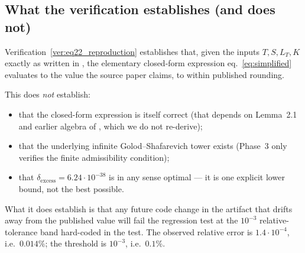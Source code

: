 \subsection{What the verification establishes (and does not)}

Verification~\ref{ver:eq22_reproduction} establishes that, given the
inputs $T, S, L_T, K$ exactly as written in
\cite[\S2.1]{Sawin2026Remarks}, the elementary closed-form expression
eq.~\eqref{eq:simplified} evaluates to the value the source paper
claims, to within published rounding.

This does \emph{not} establish:
\begin{itemize}[leftmargin=*]
  \item that the closed-form expression is itself correct (that
        depends on Lemma~2.1 and earlier algebra of \cite{Sawin2026Remarks},
        which we do not re-derive);
  \item that the underlying infinite Golod--Shafarevich tower exists
        (Phase~3 only verifies the finite admissibility condition);
  \item that $\delta_{\text{excess}} = 6.24 \cdot 10^{-38}$ is in any
        sense optimal --- it is one explicit lower bound, not the best
        possible.
\end{itemize}

What it does establish is that any future code change in the artifact
that drifts away from the published value will fail the regression
test at the $10^{-3}$ relative-tolerance band hard-coded in the test.
The observed relative error is $1.4 \cdot 10^{-4}$, i.e.\ $0.014\%$;
the threshold is $10^{-3}$, i.e.\ $0.1\%$.
